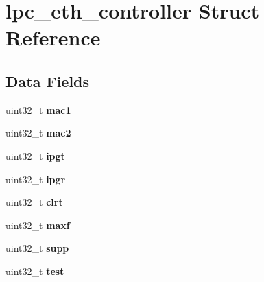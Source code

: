 \hypertarget{structlpc__eth__controller}{}\section{lpc\+\_\+eth\+\_\+controller Struct Reference}
\label{structlpc__eth__controller}
\subsection*{Data Fields}
\begin{DoxyCompactItemize}
\item 
\mbox{\label{structlpc__eth__controller_adf96646800d58f0cdb0260b7cecb9e9a}} 
uint32\+\_\+t {\bfseries mac1}
\item 
\mbox{\label{structlpc__eth__controller_ada6129d53679f959898d23fa1717485f}} 
uint32\+\_\+t {\bfseries mac2}
\item 
\mbox{\label{structlpc__eth__controller_a50b3b6ba00d9051b1150b2e1a78ee3d1}} 
uint32\+\_\+t {\bfseries ipgt}
\item 
\mbox{\label{structlpc__eth__controller_aceb427873e908b6992f4abb517d91c2c}} 
uint32\+\_\+t {\bfseries ipgr}
\item 
\mbox{\label{structlpc__eth__controller_ab8fb29efff40d9354dc7a1704f192fb8}} 
uint32\+\_\+t {\bfseries clrt}
\item 
\mbox{\label{structlpc__eth__controller_acbecb892547b01aca70cb744626af6cd}} 
uint32\+\_\+t {\bfseries maxf}
\item 
\mbox{\label{structlpc__eth__controller_ad546f8f06aa3842c2b6675d02aaccb31}} 
uint32\+\_\+t {\bfseries supp}
\item 
\mbox{\label{structlpc__eth__controller_a609828d0b12c49a063795fa3421b649a}} 
uint32\+\_\+t {\bfseries test}
\item 
\mbox{\label{structlpc__eth__controller_a1e356e43bfa31d093021e065f33a8f1e}} 

\end{DoxyCompactItemize}
